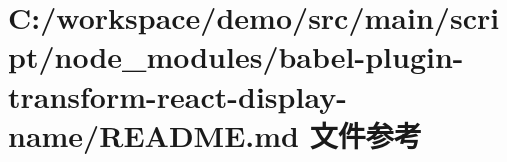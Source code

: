\hypertarget{node__modules_2babel-plugin-transform-react-display-name_2_r_e_a_d_m_e_8md}{}\section{C\+:/workspace/demo/src/main/script/node\+\_\+modules/babel-\/plugin-\/transform-\/react-\/display-\/name/\+R\+E\+A\+D\+ME.md 文件参考}
\label{node__modules_2babel-plugin-transform-react-display-name_2_r_e_a_d_m_e_8md}
